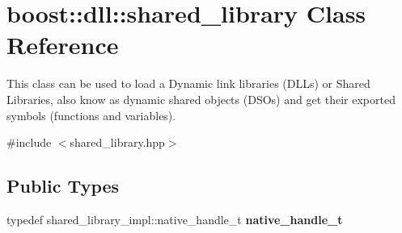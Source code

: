 \hypertarget{a00271}{}\section{boost\+:\+:dll\+:\+:shared\+\_\+library Class Reference}
\label{a00271}


This class can be used to load a Dynamic link libraries (D\+LL\textquotesingle{}s) or Shared Libraries, also know as dynamic shared objects (D\+SO\textquotesingle{}s) and get their exported symbols (functions and variables).  




{\ttfamily \#include $<$shared\+\_\+library.\+hpp$>$}

\subsection*{Public Types}
\begin{DoxyCompactItemize}
\item 
typedef shared\+\_\+library\+\_\+impl\+::native\+\_\+handle\+\_\+t {\bfseries native\+\_\+handle\+\_\+t}\hypertarget{a00271_a1426dcbd29eac5cef8da0e9218c2c127}{}\label{a00271_a1426dcbd29eac5cef8da0e9218c2c127}

\end{DoxyCompactItemize}
